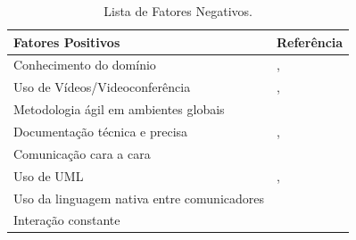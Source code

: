 \begin{longtable}{|p{5cm}|p{10cm}|}
\caption{Lista de Fatores Negativos.}

\hline
\textbf{Fatores Positivos}                                                    & \textbf{Referência}                                                \\ \hline
Conhecimento do domínio                                                       & \cite{herbsleb2007global} \cite{hilbrich2017enforcing} \cite{schneider2017reframing} \cite{gates1997identification} \cite{aranda2009analyzing}  \cite{5457325},                                       \\ \hline
Uso de Vídeos/Videoconferência                                                & \cite{Oran:2017:ARC:3131151.3131166}, \cite{calazans2017software}  \cite{alnuem2012requirements} \cite{ali2016method} \cite{korkala2009distributed}
            \\ \hline
Metodologia ágil em ambientes globais                                         & \cite{knauss2014openness} \cite{noordeloos2012rup} \cite{wilks2012self} \cite{wongthongtham2006ontology} \cite{Hess2018}             \\ \hline
Documentação técnica e precisa                                                & \cite{soltani2015cross}\cite{knauss2014openness}, \cite{liskin2015artifacts} \cite{PERNSTAL201544} 
    \\ \hline
Comunicação cara a cara                                                       & \cite{wongthongtham2006ontology} \cite{Hess2018} \cite{aranda2009analyzing}
 \cite{korkala2009distributed}                                           \\ \hline
Uso de UML                                                                    & \cite{wasson2006case} \cite{diel2016communication} \cite{schneider2017reframing}, \cite{karlsson2007requirements}                   \\ \hline
Uso da linguagem nativa entre comunicadores                                   & \cite{aranda2009analyzing} \cite{6337317}             \cite{Takura19961716}                                                            \\ \hline
Interação constante                                                           & \cite{noordeloos2012rup} \cite{marnewick2011perspective} \cite{dos2013impact}  
            \\ \hline

\end{longtable}
